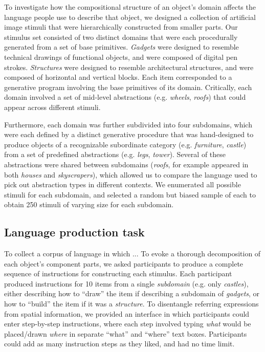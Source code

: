 \documentclass[10pt,letterpaper]{article}
\begin{document}
To investigate how the compositional structure of an object's domain affects the language people use to describe that object, we designed a collection of artificial image stimuli that were hierarchically constructed from smaller parts. 
Our stimulus set consisted of two distinct domains that were each procedurally generated from a set of base primitives.
\textit{Gadgets} were designed to resemble technical drawings of functional objects, and were composed of digital pen strokes. 
\textit{Structures} were designed to resemble architectural structures, and were composed of horizontal and vertical blocks.
Each item corresponded to a generative program involving the base primitives of its domain. 
Critically, each domain involved a set of mid-level abstractions  (e.g. \textit{wheels}, \textit{roofs}) that could appear across different stimuli. 

Furthermore, each domain was further subdivided into four subdomains, which were each defined by a distinct generative procedure that was hand-designed to produce objects of a recognizable subordinate category (e.g. \textit{furniture}, \textit{castle}) from a set of predefined abstractions (e.g. \textit{legs}, \textit{tower}).
Several of these abstractions were shared between subdomains (\textit{roofs}, for example appeared in both \textit{houses} and \textit{skyscrapers}), which allowed us to compare the language used to pick out abstraction types in different contexts.
We enumerated all possible stimuli for each subdomain, and selected a random but biased sample of each to obtain 250 stimuli of varying size for each subdomain.


\subsection{Language production task}

To collect a corpus of language in which ...
To evoke a thorough decomposition of each object's component parts, we asked participants to produce a complete sequence of instructions for constructing each stimulus.
Each participant produced instructions for 10 items from a single \textit{subdomain} (e.g. only \textit{castles}), either describing how to ``draw'' the item if describing a subdomain of \textit{gadgets}, or how to ``build'' the item if it was a \textit{structure}.
To disentangle referring expressions from spatial information, we provided an interface in which participants could enter step-by-step instructions, where each step involved typing \textit{what} would be placed/drawn \textit{where} in separate ``what'' and ``where'' text boxes.
Participants could add as many instruction steps as they liked, and had no time limit.
\end{document}

